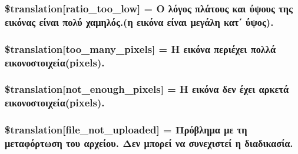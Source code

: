 \subsubsection[{\$translation}]{\setlength{\rightskip}{0pt plus 5cm}\$translation\mbox{[}\textquotesingle{}ratio\+\_\+too\+\_\+low\textquotesingle{}\mbox{]} = \textquotesingle{}Ο λόγος πλάτους και ύψους της εικόνας είναι πολύ χαμηλός.(η εικόνα είναι μεγάλη κατ΄ ύψος).\textquotesingle{}}\label{class_8upload_8el___g_r_8php_ac533b9a479f056b0b8623e4268f068c2}
\hypertarget{class_8upload_8el___g_r_8php_aa4051ef64e94a3f8295c63cf85544016}{}
\subsubsection[{\$translation}]{\setlength{\rightskip}{0pt plus 5cm}\$translation\mbox{[}\textquotesingle{}too\+\_\+many\+\_\+pixels\textquotesingle{}\mbox{]} = \textquotesingle{}Η εικόνα περιέχει πολλά εικονοστοιχεία(pixels).\textquotesingle{}}\label{class_8upload_8el___g_r_8php_aa4051ef64e94a3f8295c63cf85544016}
\hypertarget{class_8upload_8el___g_r_8php_a1fe342c27ce61f4ff4e0120ba647033e}{}
\subsubsection[{\$translation}]{\setlength{\rightskip}{0pt plus 5cm}\$translation\mbox{[}\textquotesingle{}not\+\_\+enough\+\_\+pixels\textquotesingle{}\mbox{]} = \textquotesingle{}Η εικόνα δεν έχει αρκετά εικονοστοιχεία(pixels).\textquotesingle{}}\label{class_8upload_8el___g_r_8php_a1fe342c27ce61f4ff4e0120ba647033e}
\hypertarget{class_8upload_8el___g_r_8php_a4ce76e7be0b3a03c2b47f6d70c21832e}{}
\subsubsection[{\$translation}]{\setlength{\rightskip}{0pt plus 5cm}\$translation\mbox{[}\textquotesingle{}file\+\_\+not\+\_\+uploaded\textquotesingle{}\mbox{]} = \textquotesingle{}Πρόβλημα με τη μεταφόρτωση του αρχείου. Δεν μπορεί να συνεχιστεί η διαδικασία.\textquotesingle{}}\label{class_8upload_8el___g_r_8php_a4ce76e7be0b3a03c2b47f6d70c21832e}
\hypertarget{class_8upload_8el___g_r_8php_afd84e910217f04139f567c41e292afa5}{}
